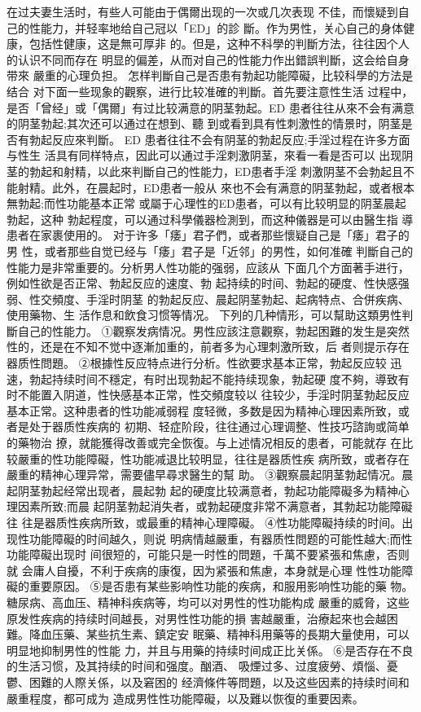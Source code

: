 \documentclass[12pt,UTF8]{ctexbook}
\begin{document}
在过夫妻生活时，有些人可能由于偶爾出现的一次或几次表现
不佳，而懷疑到自己的性能力，并轻率地给自己冠以「ED」的診
斷。作为男性，关心自己的身体健康，包括性健康，这是無可厚非
的。但是，这种不科學的判斷方法，往往因个人的认识不同而存在
明显的偏差，从而对自己的性能力作出錯誤判斷，这会给自身带來
嚴重的心理负担。
怎样判斷自己是否患有勃起功能障礙，比较科學的方法是结合
对下面一些现象的觀察，进行比较准確的判斷。首先要注意性生活
过程中，是否「曾经」或「偶爾」有过比较满意的阴茎勃起。ED
患者往往从來不会有满意的阴茎勃起;其次还可以通过在想到、聽
到或看到具有性刺激性的情景时，阴茎是否有勃起反应來判斷。
ED 患者往往不会有阴茎的勃起反应;手淫过程在许多方面与性生
活具有同样特点，因此可以通过手淫刺激阴茎，來看一看是否可以
出现阴茎的勃起和射精，以此來判斷自己的性能力，ED患者手淫
刺激阴茎不会勃起且不能射精。此外，在晨起时，ED患者一般从
來也不会有满意的阴茎勃起，或者根本無勃起;而性功能基本正常
或屬于心理性的ED患者，可以有比较明显的阴茎晨起勃起，这种
勃起程度，可以通过科學儀器检測到，而这种儀器是可以由醫生指
導患者在家裹使用的。
对于许多「痿」君子們，或者那些懷疑自己是「痿」君子的男
性，或者那些自觉已经与「痿」君子是「近邻」的男性，如何准確
判斷自己的性能力是非常重要的。分析男人性功能的强弱，应該从
下面几个方面著手进行，例如性欲是否正常、勃起反应的速度、勃
起持续的时间、勃起的硬度、性快感强弱、性交頻度、手淫时阴茎
的勃起反应、晨起阴茎勃起、起病特点、合併疾病、使用藥物、生
活作息和飲食习惯等情况。
下列的几种情形，可以幫助这類男性判斷自己的性能力。
①觀察发病情况。男性应該注意觀察，勃起困難的发生是突然
性的，还是在不知不觉中逐漸加重的，前者多为心理刺激所致，后
者则提示存在器质性問題。
②根據性反应特点进行分析。性欲要求基本正常，勃起反应较
迅速，勃起持续时间不穩定，有时出现勃起不能持续现象，勃起硬
度不夠，導致有时不能置入阴道，性快感基本正常，性交頻度较以
往较少，手淫时阴茎勃起反应基本正常。这种患者的性功能减弱程
度轻微，多数是因为精神心理因素所致，或者是处于器质性疾病的
初期、轻症阶段，往往通过心理调整、性技巧諮詢或简单的藥物治
撩，就能獲得改善或完全恢復。与上述情况相反的患者，可能就存
在比较嚴重的性功能障礙，性功能减退比较明显，往往是器质性疾
病所致，或者存在嚴重的精神心理异常，需要儘早尋求醫生的幫
助。
③觀察晨起阴茎勃起情况。晨起阴茎勃起经常出现者，晨起勃
起的硬度比较满意者，勃起功能障礙多为精神心理因素所致;而晨
起阴茎勃起消失者，或勃起硬度非常不满意者，其勃起功能障礙往
往是器质性疾病所致，或最重的精神心理障礙。
④性功能障礙持续的时间。出现性功能障礙的时间越久，则说
明病情越嚴重，有器质性問题的可能性越大;而性功能障礙出现时
间很短的，可能只是一时性的問題，千萬不要紧張和焦慮，否则就
会庸人自擾，不利于疾病的康復，因为紧張和焦慮，本身就是心理
性性功能障礙的重要原因。
⑤是否患有某些影响性功能的疾病，和服用影响性功能的藥
物。糖尿病、高血压、精神科疾病等，均可以对男性的性功能构成
嚴重的威脅，这些原发性疾病的持续时间越長，对男性性功能的損
害越嚴重，治療起來也会越困難。降血压藥、某些抗生素、鎮定安
眠藥、精神科用藥等的長期大量使用，可以明显地抑制男性的性能
力，并且与用藥的持续时间成正比关係。
⑥是否存在不良的生活习惯，及其持续的时间和强度。酗酒、
吸煙过多、过度疲勞、煩惱、憂鬱、困難的人際关係，以及窘困的
经濟條件等問題，以及这些因素的持续时间和嚴重程度，都可成为
造成男性性功能障礙，以及難以恢復的重要因素。
\end{document}
